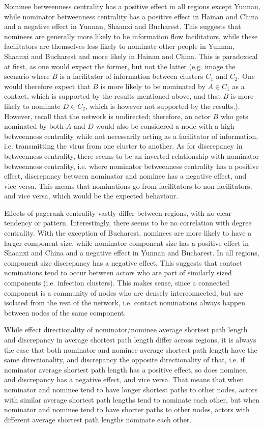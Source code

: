 Nominee betweenness centrality has a positive effect in all regions except Yunnan, while nominator betweenness centrality has a positive effect in Hainan and China and a negative effect in Yunnan, Shaanxi and Bucharest. This suggests that nominees are generally more likely to be information flow facilitators, while these facilitators are themselves less likely to nominate other people in Yunnan, Shaanxi and Bucharest and more likely in Hainan and China. This is paradoxical at first, as one would expect the former, but not the latter (e.g. image the scenario where $B$ is a facilitator of information between clusters $C_1$ and $C_2$. One would therefore expect that $B$ is more likely to be nominated by $A\in C_1$ as a contact, which is supported by the results mentioned above, and that $B$ is more likely to nominate $D\in C_2$, which is however not supported by the results.). However, recall that the network is  undirected; therefore, an actor $B$ who gets nominated by both $A$ and $D$ would also be considered a node with a high betweenness centrality while not necessarily acting as a facilitator of information, i.e. transmitting the virus from one cluster to another. As for discrepancy in betweenness centrality, there seems to be an inverted relationship with nominator betweenness centrality, i.e. where nominator betweenness centrality has a positive effect, discrepancy between nominator and nominee has a negative effect, and vice versa. This means that nominations go from facilitators to non-facilitators, and vice versa, which would be the expected behaviour.

Effects of pagerank centrality vastly differ between regions, with no clear tendency or pattern. Interestingly, there seems to be no correlation with degree centrality. With the exception of Bucharest, nominees are more likely to have a larger component size, while nominator component size has a positive effect in Shaanxi and China and a negative effect in Yunnan and Bucharest. In all regions, component size discrepancy has a negative effect. This suggests that contact nominations tend to occur between actors who are part of similarly sized components (i.e. infection clusters). This makes sense, since a connected component is a community of nodes who are densely interconnected, but are isolated from the rest of the network, i.e. contact nominations always happen between nodes of the same component.

While effect directionality of nominator/nominee average shortest path length and discrepancy in average shortest path length differ across regions, it is always the case that both nominator and nominee average shortest path length have the same directionality, and discrepancy the opposite directionality of that, i.e. if nominator average shortest path length has a positive effect, so does nominee, and discrepancy has a negative effect, and vice versa. That means that when nominator and nominee tend to have longer shortest paths to other nodes, actors with similar average shortest path lengths tend to nominate each other, but when nominator and nominee tend to have shorter paths to other nodes, actors with different average shortest path lengths nominate each other.


